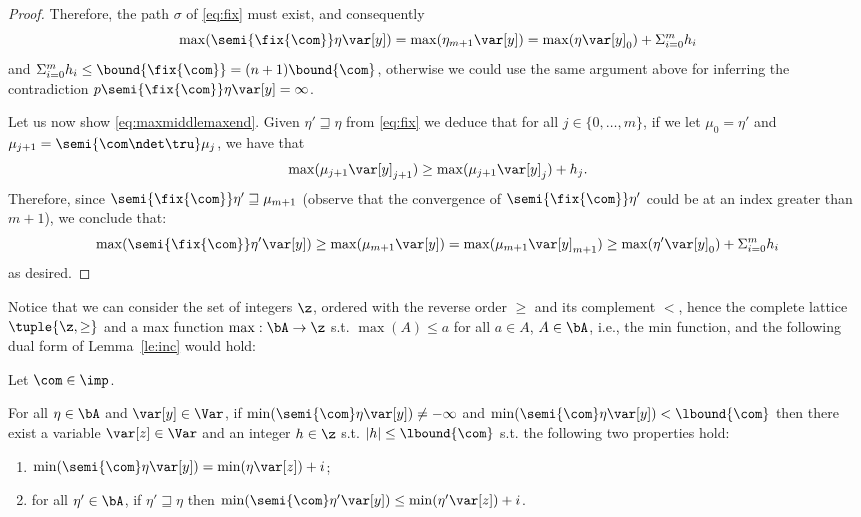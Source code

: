\begin{proof}
  \noindent
  Therefore, the path \(\sigma\) of \eqref{eq:fix} must exist, and
  consequently
  \[\max(\semi{\fix{\com}} \eta \var[y]) = \max(\eta_{m+1} \var[y]) =
    \max(\eta \var[y]_0) + \Sigma_{i=0}^m h_i\] and
  \(\Sigma_{i=0}^m h_i \leq \bound{\fix{\com}}=(n+1)\bound{\com}\),
  otherwise we could use the same argument above for inferring the
  contradiction \(p\semi{\fix{\com}} \eta \var[y] = \infty\).

  \medskip

  Let us now show \eqref{eq:maxmiddlemaxend}. Given
  \(\eta' \sqsupseteq \eta\) from \eqref{eq:fix} we deduce that for
  all \(j \in \{ 0, \ldots, m\}\), if we let \(\mu_0 = \eta'\) and
  \(\mu_{j+1} = \semi{\com \ndet \tru} \mu_j\), we have that
  \[
    \max(\mu_{j+1} \var[y]_{j+1}) \geq \max(\mu_{j+1} \var[y]_{j}) +
    h_j. \]
  Therefore, since \(\semi{\fix{\com}} \eta' \sqsupseteq \mu_{m+1}\)
  (observe that the convergence of \(\semi{\fix{\com}} \eta' \) could
  be at an index greater than \(m+1\)), we conclude that:
  \[\max(\semi{\fix{\com}} \eta' \var[y]) \geq \max(\mu_{m+1}
  \var[y]) = \max(\mu_{m+1} \var[y]_{m+1}) \geq \max(\eta' \var[y]_0)
  + \Sigma_{i=0}^m h_i\] as desired.
\end{proof}

Notice that we can consider the set of integers \(\z\), ordered with
the reverse order \(\geq\) and its complement \(<\), hence the
complete lattice \(\tuple{\z, \geq}\) and a max function
\({\max : \bA \to \z}\) s.t. \(\max(A) \leq a\) for all \(a\in A\),
\(A \in \bA\), i.e., the min function, and the following dual form of
Lemma~\ref{le:inc} would hold:

\begin{corollary}\label{co:inc}
  Let \(\com \in \imp\).
  
  \noindent
  For all \(\eta \in \bA\) and
  \(\var[y] \in \Var\), if
  \(\min(\semi{\com}\eta\var[y]) \neq -\infty\) and
  \(\min(\semi{\com}\eta\var[y]) < \lbound{\com}\) then there exist a
  variable \(\var[z] \in\Var\) and an integer \(h \in \z\) s.t.
  \(|h| \leq \lbound{\com}\) s.t. the following two properties hold:
  
  \begin{enumerate}[label=(\roman*)]
  \item \(\min(\semi{\com}\eta \var[y]) = \min(\eta \var[z]) + i\); \label{point1min}
  \item  for all \(\eta' \in \bA\), if \(\eta' \sqsupseteq \eta\)
    then
    \(\min(\semi{\com}\eta' \var[y]) \leq \min(\eta' \var[z]) + i\). \label{point2min}
  \end{enumerate}
\end{corollary}

